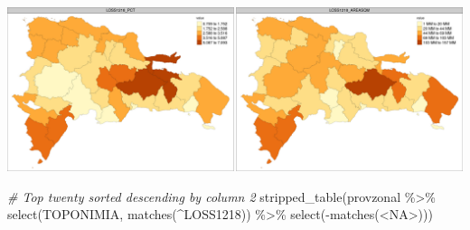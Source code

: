 \documentclass[10pt,landscape,a3paper]{article}
\newenvironment{Shaded}{\begin{snugshade}}{\end{snugshade}}
\newcommand{\CommentTok}[1]{\textcolor[rgb]{0.56,0.35,0.01}{\textit{#1}}}
\newcommand{\FunctionTok}[1]{\textcolor[rgb]{0.00,0.00,0.00}{#1}}
\newcommand{\NormalTok}[1]{#1}
\newcommand{\SpecialCharTok}[1]{\textcolor[rgb]{0.00,0.00,0.00}{#1}}
\newcommand{\StringTok}[1]{\textcolor[rgb]{0.31,0.60,0.02}{#1}}
\begin{document}
\begin{center}\includegraphics{img/data-download-preparation-eda/zonal-prov-5} \end{center}

\begin{Shaded}
\begin{Highlighting}[]
\CommentTok{\# Top twenty sorted descending by column 2}
\FunctionTok{stripped\_table}\NormalTok{(provzonal }\SpecialCharTok{\%\textgreater{}\%} \FunctionTok{select}\NormalTok{(TOPONIMIA, }\FunctionTok{matches}\NormalTok{(}\StringTok{\textquotesingle{}\^{}LOSS1218\textquotesingle{}}\NormalTok{)) }\SpecialCharTok{\%\textgreater{}\%} \FunctionTok{select}\NormalTok{(}\SpecialCharTok{{-}}\FunctionTok{matches}\NormalTok{(}\StringTok{\textquotesingle{}\textless{}NA\textgreater{}\textquotesingle{}}\NormalTok{)))}
\end{Highlighting}
\end{Shaded}
\end{document}
